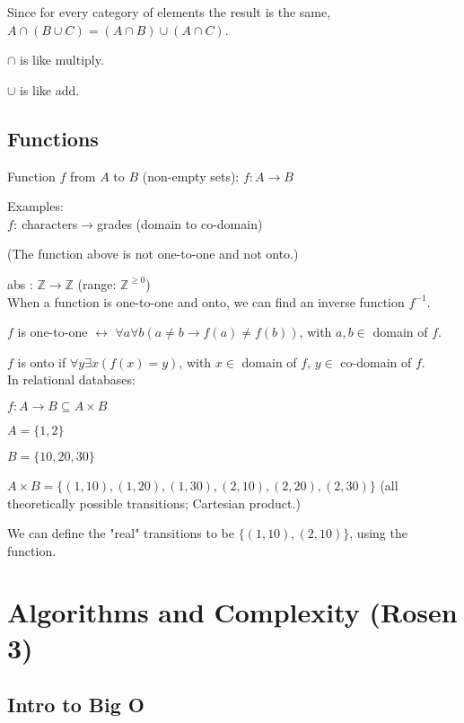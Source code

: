\documentclass[english,openany]{book}
\begin{document}
	Since for every category of elements the result is the same, $A \cap (B \cup C) = (A \cap B) \cup (A \cap C)$.

	$\cap$ is like multiply.

	$\cup$ is like add.

	\section{Functions}

	Function $f$ from $A$ to $B$ (non-empty sets): $f : A \rightarrow B$

    Examples:\\

	$f :\ $characters$ \rightarrow $grades (domain to co-domain)

    (The function above is not one-to-one and not onto.)

    abs : $\mathbb Z \rightarrow \mathbb Z$ (range: $\mathbb Z^{\geq 0}$)\\


    When a function is one-to-one and onto, we can find an inverse function $f^{-1}$.

    $f$ is one-to-one $\leftrightarrow$ $\forall a \forall b (a \neq b \rightarrow f(a) \neq f(b))$, with $a,b \in$ domain of $f$.

    $f$ is onto if $\forall y \exists x (f(x) = y)$, with $x \in$ domain of $f$, $y \in$ co-domain of $f$.\\

    In relational databases:

    $f : A \rightarrow B \subseteq A \times B$

    $A = \{1,2\}$

    $B = \{10,20,30\}$

    $A \times B = \{(1,10),(1,20),(1,30),(2,10),(2,20),(2,30)\}$ (all theoretically possible transitions; Cartesian product.)

    We can define the "real" transitions to be $\{(1,10),(2,10)\}$, using the function.

    \chapter{Algorithms and Complexity (Rosen 3)}

    \section{Intro to Big O}
\end{document}
